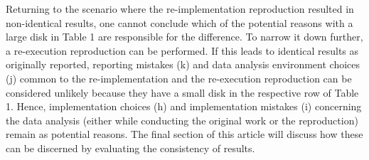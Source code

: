 \documentclass[authordate, meta]{jote-new-article}
\begin{document}
	Returning to the scenario where the re-implementation reproduction resulted in non-identical results, one cannot conclude which of the potential reasons with a large disk in Table 1 are responsible for the difference. To narrow it down further, a re-execution reproduction can be performed. If this leads to identical results as originally reported, reporting mistakes (k) and data analysis environment choices (j) common to the re-implementation and the re-execution reproduction can be considered unlikely because they have a small disk in the respective row of Table 1. Hence, implementation choices (h) and implementation mistakes (i) concerning the data analysis (either while conducting the original work or the reproduction) remain as potential reasons. The final section of this article will discuss how these can be discerned by evaluating the consistency of results.
\end{document}

